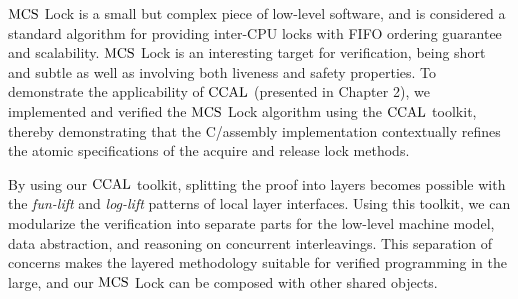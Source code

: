 $\mathrm{MCS}$ Lock is a small but complex piece of low-level software, 
and is considered a standard algorithm for providing inter-CPU locks with FIFO ordering guarantee and scalability. 
$\mathrm{MCS}$ Lock is an interesting target for verification, being short and subtle as well as involving both liveness and safety properties. 
To demonstrate the applicability of $\mathrm{CCAL}$ (presented in Chapter 2), we implemented and verified the $\mathrm{MCS}$ Lock algorithm using the $\mathrm{CCAL}$  toolkit, thereby demonstrating that the C/assembly implementation contextually refines the atomic specifications of the acquire and release lock methods.

By using our  $\mathrm{CCAL}$ toolkit, splitting the proof into layers becomes possible with the \textit{fun-lift} and \textit{log-lift} patterns of local layer interfaces. 
Using this toolkit, we can modularize the verification into separate parts for the low-level machine model, data abstraction, 
and reasoning on concurrent interleavings. 
This separation of concerns makes the layered methodology suitable for verified programming in the large, and our $\mathrm{MCS}$
Lock can be composed with other shared objects.

